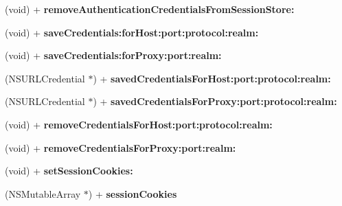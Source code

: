 \begin{DoxyCompactItemize}
\item 
\hypertarget{interface_a_s_i_h_t_t_p_request_ac04306801de4f656b5afafa252096af0}{
(void) + {\bfseries removeAuthenticationCredentialsFromSessionStore:}}
\label{interface_a_s_i_h_t_t_p_request_ac04306801de4f656b5afafa252096af0}

\item 
\hypertarget{interface_a_s_i_h_t_t_p_request_a9b1885aade1179e0d49cad69d8c15abe}{
(void) + {\bfseries saveCredentials:forHost:port:protocol:realm:}}
\label{interface_a_s_i_h_t_t_p_request_a9b1885aade1179e0d49cad69d8c15abe}

\item 
\hypertarget{interface_a_s_i_h_t_t_p_request_a12962e3fa0356a77478a1aac1f2d2def}{
(void) + {\bfseries saveCredentials:forProxy:port:realm:}}
\label{interface_a_s_i_h_t_t_p_request_a12962e3fa0356a77478a1aac1f2d2def}

\item 
\hypertarget{interface_a_s_i_h_t_t_p_request_a443ec6e082e2b1ab9d7568d6875068c7}{
(NSURLCredential $\ast$) + {\bfseries savedCredentialsForHost:port:protocol:realm:}}
\label{interface_a_s_i_h_t_t_p_request_a443ec6e082e2b1ab9d7568d6875068c7}

\item 
\hypertarget{interface_a_s_i_h_t_t_p_request_a9a85cf244d073467d56e328d83760f2d}{
(NSURLCredential $\ast$) + {\bfseries savedCredentialsForProxy:port:protocol:realm:}}
\label{interface_a_s_i_h_t_t_p_request_a9a85cf244d073467d56e328d83760f2d}

\item 
\hypertarget{interface_a_s_i_h_t_t_p_request_a5280dcb803450e7187587972ce540652}{
(void) + {\bfseries removeCredentialsForHost:port:protocol:realm:}}
\label{interface_a_s_i_h_t_t_p_request_a5280dcb803450e7187587972ce540652}

\item 
\hypertarget{interface_a_s_i_h_t_t_p_request_a213e5645cbf90459d6e7b987d24ddd33}{
(void) + {\bfseries removeCredentialsForProxy:port:realm:}}
\label{interface_a_s_i_h_t_t_p_request_a213e5645cbf90459d6e7b987d24ddd33}

\item 
\hypertarget{interface_a_s_i_h_t_t_p_request_aa1a0ecf9217c99bd0d252c0ff473ab22}{
(void) + {\bfseries setSessionCookies:}}
\label{interface_a_s_i_h_t_t_p_request_aa1a0ecf9217c99bd0d252c0ff473ab22}

\item 
\hypertarget{interface_a_s_i_h_t_t_p_request_a5995ee20ada072e51da56a940e0b0f28}{
(NSMutableArray $\ast$) + {\bfseries sessionCookies}}
\label{interface_a_s_i_h_t_t_p_request_a5995ee20ada072e51da56a940e0b0f28}


\end{DoxyCompactItemize}

